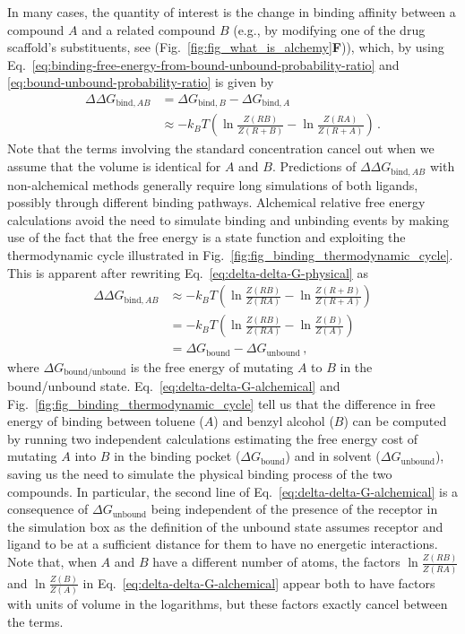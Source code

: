 \documentclass[9pt,bestpractices,pubversion]{livecoms}
\begin{document}
In many cases, the quantity of interest is the change in binding affinity between a compound $A$ and a related compound $B$ (e.g., by modifying one of the drug scaffold's substituents, see (Fig.~\ref{fig:fig_what_is_alchemy}\textbf{F})), which, by using Eq.~\ref{eq:binding-free-energy-from-bound-unbound-probability-ratio} and \ref{eq:bound-unbound-probability-ratio} is given by
\begin{equation}\label{eq:delta-delta-G-physical}
\begin{split}
    \Delta \Delta G_{\mathrm{bind}, AB} &= \Delta G_{\mathrm{bind}, B} - \Delta G_{\mathrm{bind}, A} \\
    &\approx -k_BT \left( \ln \frac{Z(RB)}{Z(R+B)} - \ln \frac{Z(RA)}{Z(R+A)} \right) \, .
\end{split}
\end{equation}
Note that the terms involving the standard concentration cancel out when we assume that the volume is identical for $A$ and $B$.
Predictions of $\Delta \Delta G_{\mathrm{bind}, AB}$ with non-alchemical methods generally require long simulations of both ligands, possibly through different binding pathways.
Alchemical relative free energy calculations avoid the need to simulate binding and unbinding events by making use of the fact that the free energy is a state function and exploiting the thermodynamic cycle illustrated in Fig.~\ref{fig:fig_binding_thermodynamic_cycle}.
This is apparent after rewriting Eq.~\ref{eq:delta-delta-G-physical} as
\begin{equation}\label{eq:delta-delta-G-alchemical}
\begin{split}
    \Delta \Delta G_{\mathrm{bind}, AB} &\approx -k_BT \left( \ln \frac{Z(RB)}{Z(RA)} - \ln \frac{Z(R+B)}{Z(R+A)} \right) \\
    &= -k_BT \left( \ln \frac{Z(RB)}{Z(RA)} - \ln \frac{Z(B)}{Z(A)} \right) \\
    &= \Delta G_{\mathrm{bound}} - \Delta G_{\mathrm{unbound}} \, ,
\end{split}
\end{equation}
where $\Delta G_{\mathrm{bound/unbound}}$ is the free energy of mutating $A$ to $B$ in the bound/unbound state.
Eq.~\ref{eq:delta-delta-G-alchemical} and Fig.~\ref{fig:fig_binding_thermodynamic_cycle} tell us that the difference in free energy of binding between toluene ($A$) and benzyl alcohol ($B$) can be computed by running two independent calculations estimating the free energy cost of mutating $A$ into $B$ in the binding pocket ($\Delta G_{\mathrm{bound}}$) and in solvent ($\Delta G_{\mathrm{unbound}}$), saving us the need to simulate the physical binding process of the two compounds.
In particular, the second line of Eq.~\ref{eq:delta-delta-G-alchemical} is a consequence of $\Delta G_{\mathrm{unbound}}$ being independent of the presence of the receptor in the simulation box as the definition of the unbound state assumes receptor and ligand to be at a sufficient distance for them to have no energetic interactions.
Note that, when $A$ and $B$ have a different number of atoms, the factors $ \ln \frac{Z(RB)}{Z(RA)}$ and $\ln \frac{Z(B)}{Z(A)}$ in   Eq.~\ref{eq:delta-delta-G-alchemical} appear both to have factors with units of volume in the logarithms, but these factors exactly cancel between the terms.
\end{document}
